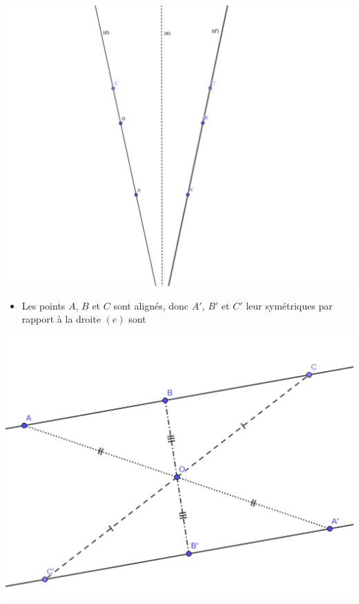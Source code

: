 \documentclass[12pt,a4paper]{article}
\date{}
\title{}
\begin{document}





\newpage

\begin{myexs}
	\begin{multicols}{2}
		\begin{center}
			\includegraphics[scale=0.1]{sym_droites1}
		\end{center}
		
		\begin{itemize}
			\item Les points $A$, $B$ et $C$ sont alignés, donc $A'$, $B'$ et $C'$ leur symétriques par rapport à la droite $(e)$ sont \hspace*{6cm}
		\end{itemize}	
		
		\begin{center}
			\includegraphics[scale=0.2]{sym_droites2}
		\end{center}
		

\end{multicols}
\end{myexs}
\end{document}

